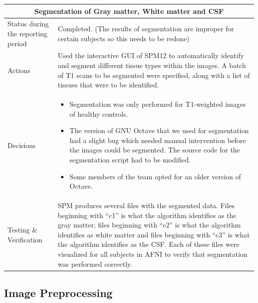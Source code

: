 \documentclass[12pt]{article}
\begin{document}
\begin{table}[H]
  \centering
  \begin{tabular} {| m{3.3cm} | m{11.5cm} | }
    \hline
    \multicolumn{2}{|c|}{Segmentation of Gray matter, White matter and
    CSF} \\ \hline
    Status during the reporting period   & Completed. (The results of
    segmentation are improper for certain subjects so this needs to be
    redone)   \\ \hline
    Actions &
    Used the interactive GUI of SPM12 to automatically identify and
    segment different tissue types within the images. A batch of
    T1 scans to be segmented were specified, along with a list of
    tissues that were to be identified.  \\ \hline

    Decisions &
    \begin{itemize}

      \item Segmentation was only performed for T1-weighted images of
        healthy controls.

      \item The version of GNU Octave that we used for segmentation
        had a slight bug which needed manual intervention before the
        images could be segmented. The source code for the
        segmentation script had to be modified.

      \item Some members of the team opted for an older version of
        Octave.

    \end{itemize} \\ \hline

    Testing \& Verification &
    SPM produces several files with the segmented data. Files
    beginning with ``c1'' is what the algorithm identifies as the gray
    matter; files beginning with ``c2'' is what the algorithm
    identifies as white matter and files beginning with ``c3'' is what
    the algorithm identifies as the CSF. Each of these files were
    visualized for all subjects in AFNI to verify that segmentation
    was performed correctly. \\ \hline

  \end{tabular}
\end{table}

\newpage

\subsection{Image Preprocessing}
\end{document}

